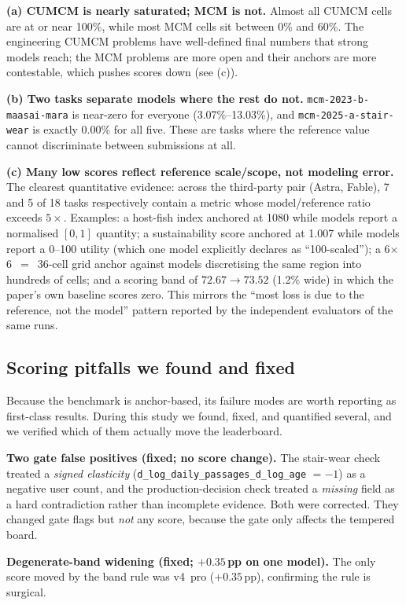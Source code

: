 \textbf{(a) CUMCM is nearly saturated; MCM is not.} Almost all CUMCM cells are at or near 100\%, while most MCM cells sit between 0\% and 60\%. The engineering CUMCM problems have well-defined final numbers that strong models reach; the MCM problems are more open and their anchors are more contestable, which pushes scores down (see (c)).

\textbf{(b) Two tasks separate models where the rest do not.} \texttt{mcm-2023-b-maasai-mara} is near-zero for everyone (3.07\%--13.03\%), and \texttt{mcm-2025-a-stair-wear} is exactly 0.00\% for all five. These are tasks where the reference value cannot discriminate between submissions at all.

\textbf{(c) Many low scores reflect reference scale/scope, not modeling error.} The clearest quantitative evidence: across the third-party pair (Astra, Fable), 7 and 5 of 18 tasks respectively contain a metric whose model/reference ratio exceeds $5\times$. Examples: a host-fish index anchored at 1080 while models report a normalised $[0,1]$ quantity; a sustainability score anchored at 1.007 while models report a 0--100 utility (which one model explicitly declares as ``100-scaled''); a 6$\times$6~$=$~36-cell grid anchor against models discretising the same region into hundreds of cells; and a scoring band of $72.67\!\to\!73.52$ (1.2\% wide) in which the paper's own baseline scores zero. This mirrors the ``most loss is due to the reference, not the model'' pattern reported by the independent evaluators of the same runs.

\subsection{Scoring pitfalls we found and fixed}
Because the benchmark is anchor-based, its failure modes are worth reporting as first-class results. During this study we found, fixed, and quantified several, and we verified which of them actually move the leaderboard.

\textbf{Two gate false positives (fixed; no score change).} The stair-wear check treated a \emph{signed elasticity} (\texttt{d\_log\_daily\_passages\_d\_log\_age} $=-1$) as a negative user count, and the production-decision check treated a \emph{missing} field as a hard contradiction rather than incomplete evidence. Both were corrected. They changed gate flags but \emph{not} any score, because the gate only affects the tempered board.

\textbf{Degenerate-band widening (fixed; $+0.35$\,pp on one model).} The only score moved by the band rule was v4~pro ($+0.35$\,pp), confirming the rule is surgical.

